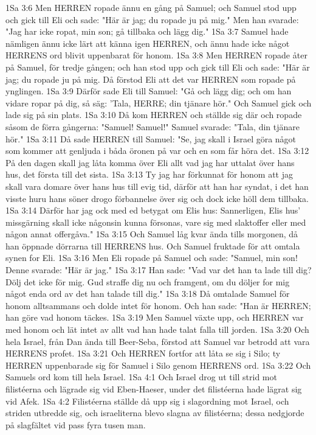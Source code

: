 1Sa 3:6  Men HERREN ropade ännu en gång på Samuel; och Samuel stod upp och gick till Eli och sade: "Här är jag; du ropade ju på mig." Men han svarade: "Jag har icke ropat, min son; gå tillbaka och lägg dig."
1Sa 3:7  Samuel hade nämligen ännu icke lärt att känna igen HERREN, och ännu hade icke något HERRENS ord blivit uppenbarat för honom.
1Sa 3:8  Men HERREN ropade åter på Samuel, för tredje gången; och han stod upp och gick till Eli och sade: "Här är jag; du ropade ju på mig. Då förstod Eli att det var HERREN som ropade på ynglingen.
1Sa 3:9  Därför sade Eli till Samuel: "Gå och lägg dig; och om han vidare ropar på dig, så säg: 'Tala, HERRE; din tjänare hör." Och Samuel gick och lade sig på sin plats.
1Sa 3:10  Då kom HERREN och ställde sig där och ropade såsom de förra gångerna: "Samuel! Samuel!" Samuel svarade: "Tala, din tjänare hör."
1Sa 3:11  Då sade HERREN till Samuel: "Se, jag skall i Israel göra något som kommer att genljuda i båda öronen på var och en som får höra det.
1Sa 3:12  På den dagen skall jag låta komma över Eli allt vad jag har uttalat över hans hus, det första till det sista.
1Sa 3:13  Ty jag har förkunnat för honom att jag skall vara domare över hans hus till evig tid, därför att han har syndat, i det han visste huru hans söner drogo förbannelse över sig och dock icke höll dem tillbaka.
1Sa 3:14  Därför har jag ock med ed betygat om Elis hus: Sannerligen, Elis hus' missgärning skall icke någonsin kunna försonas, vare sig med slaktoffer eller med någon annat offergåva."
1Sa 3:15  Och Samuel låg kvar ända tills morgonen, då han öppnade dörrarna till HERRENS hus. Och Samuel fruktade för att omtala synen for Eli.
1Sa 3:16  Men Eli ropade på Samuel och sade: "Samuel, min son! Denne svarade: "Här är jag."
1Sa 3:17  Han sade: "Vad var det han ta lade till dig? Dölj det icke för mig. Gud straffe dig nu och framgent, om du döljer for mig något enda ord av det han talade till dig."
1Sa 3:18  Då omtalade Samuel för honom alltsammans och dolde intet för honom. Och han sade: "Han är HERREN; han göre vad honom täckes.
1Sa 3:19  Men Samuel växte upp, och HERREN var med honom och lät intet av allt vad han hade talat falla till jorden.
1Sa 3:20  Och hela Israel, från Dan ända till Beer-Seba, förstod att Samuel var betrodd att vara HERRENS profet.
1Sa 3:21  Och HERREN fortfor att låta se sig i Silo; ty HERREN uppenbarade sig för Samuel i Silo genom HERRENS ord.
1Sa 3:22  Och Samuels ord kom till hela Israel.
1Sa 4:1  Och Israel drog ut till strid mot filistéerna och lägrade sig vid Eben-Haeser, under det filistéerna hade lägrat sig vid Afek.
1Sa 4:2  Filistéerna ställde då upp sig i slagordning mot Israel, och striden utbredde sig, och israeliterna blevo slagna av filistéerna; dessa nedgjorde på slagfältet vid pass fyra tusen man.

